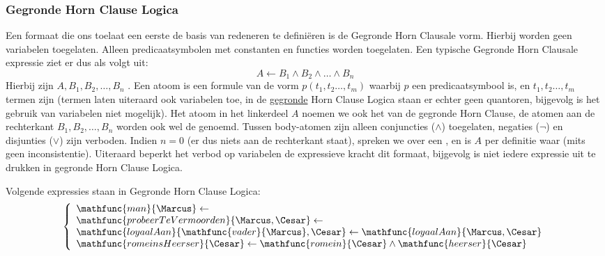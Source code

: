 \subsubsection{Gegronde Horn Clause Logica}
\label{sss:gegrondeHornClausaleLogic}
Een formaat die ons toelaat een eerste de basis van redeneren te defini\"eren is de Gegronde Horn Clausale vorm. Hierbij worden geen variabelen toegelaten. Alleen predicaatsymbolen met constanten en functies worden toegelaten. Een typische Gegronde Horn Clausale expressie ziet er dus als volgt uit:
\begin{equation}
A\leftarrow B_1\wedge B_2\wedge\ldots\wedge B_n
\end{equation}
Hierbij zijn $A,B_1,B_2,\ldots,B_n$ . Een atoom is een formule van de vorm $p\left(t_1,t_2\ldots,t_m\right)$ waarbij $p$ een predicaatsymbool is, en $t_1,t_2\ldots,t_m$ termen zijn (termen laten uiteraard ook variabelen toe, in de \underline{gegronde} Horn Clause Logica staan er echter geen quantoren, bijgevolg is het gebruik van variabelen niet mogelijk). Het atoom in het linkerdeel $A$ noemen we ook het  van de gegronde Horn Clause, de atomen aan de rechterkant $B_1,B_2,\ldots,B_n$ worden ook wel de  genoemd. Tussen body-atomen zijn alleen conjuncties ($\wedge$) toegelaten, negaties ($\neg$) en disjunties ($\vee$) zijn verboden. Indien $n=0$ (er dus niets aan de rechterkant staat), spreken we over een , en is $A$ per definitie waar (mits geen inconsistentie). Uiteraard beperkt het verbod op variabelen de expressieve kracht dit formaat, bijgevolg is niet iedere expressie uit te drukken in gegronde Horn Clause Logica.
\begin{leftbar}
Volgende expressies staan in Gegronde Horn Clause Logica:
\begin{equation}
\left\{\begin{array}{l}
\mathfunc{man}{\Marcus}\leftarrow\\
\mathfunc{probeerTeVermoorden}{\Marcus,\Cesar}\leftarrow\\
\mathfunc{loyaalAan}{\mathfunc{vader}{\Marcus},\Cesar}\leftarrow\mathfunc{loyaalAan}{\Marcus,\Cesar}\\
\mathfunc{romeinsHeerser}{\Cesar}\leftarrow\mathfunc{romein}{\Cesar}\wedge\mathfunc{heerser}{\Cesar}
\end{array}\right.
\end{equation}
\end{leftbar}
